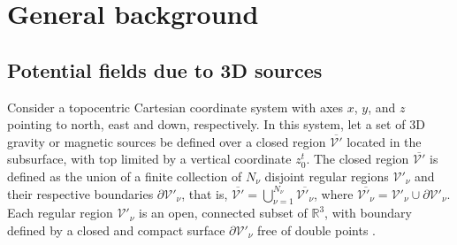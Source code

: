 \section{General background}
\label{sec:background}

\subsection{Potential fields due to 3D sources}
\label{sec:potential_fields_3D_sources}

Consider a topocentric Cartesian coordinate system with axes 
$x$, $y$, and $z$ pointing to north, east and down, respectively.
In this system, let a set of 3D gravity or magnetic sources be defined over a closed region 
$\overline{\mathcal{V}'}$ located in the subsurface, with top limited by a vertical 
coordinate $z^{t}_{0}$.
The closed region $\overline{\mathcal{V}'}$ is defined as the union of a finite collection of $N_{\nu}$ 
disjoint regular regions $\mathcal{V}'_{\nu}$ and their respective boundaries $\partial\mathcal{V}'_{\nu}$, that is, 
$\overline{\mathcal{V}'} = \bigcup_{\nu = 1}^{N_{\nu}} \overline{\mathcal{V}'_{\nu}}$, where
$\overline{\mathcal{V}'_{\nu}} = \mathcal{V}'_{\nu} \cup \partial\mathcal{V}'_{\nu}$.
Each regular region $\mathcal{V}'_{\nu}$ is an open, connected subset of $\mathbb{R}^{3}$, with boundary 
defined by a closed and compact surface $\partial \mathcal{V}'_{\nu}$ free of double points 
\citep[][p. 22]{freeden_gerhards2012}.

